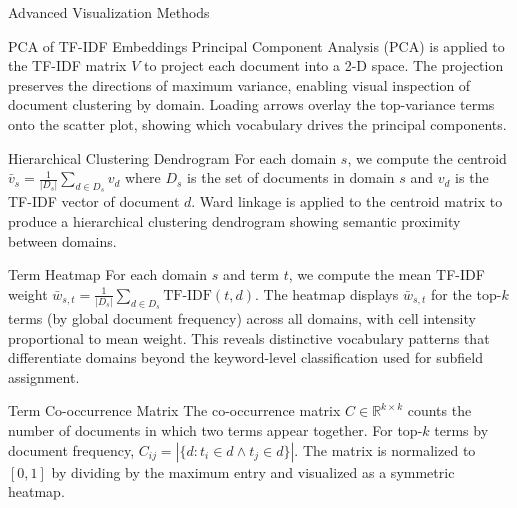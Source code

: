 \documentclass[
  ignorenonframetext,
]{beamer}
\begin{document}
\begin{frame}[allowframebreaks]{Advanced Visualization Methods
\label{sec:appendix_viz}}
\protect{}\label{advanced-visualization-methods}
\begin{block}{PCA of TF-IDF Embeddings}
\protect{}\label{pca-of-tf-idf-embeddings}
Principal Component Analysis (PCA) is applied to the TF-IDF matrix \(V\)
to project each document into a 2-D space. The projection preserves the
directions of maximum variance, enabling visual inspection of document
clustering by domain. Loading arrows overlay the top-variance terms onto
the scatter plot, showing which vocabulary drives the principal
components.
\end{block}

\begin{block}{Hierarchical Clustering Dendrogram}
\protect{}\label{hierarchical-clustering-dendrogram}
For each domain \(s\), we compute the centroid
\(\bar{v}_s = \frac{1}{|D_s|} \sum_{d \in D_s} v_d\) where \(D_s\) is
the set of documents in domain \(s\) and \(v_d\) is the TF-IDF vector of
document \(d\). Ward linkage is applied to the centroid matrix to
produce a hierarchical clustering dendrogram showing semantic proximity
between domains.
\end{block}

\begin{block}{Term Heatmap}
\protect{}\label{term-heatmap}
For each domain \(s\) and term \(t\), we compute the mean TF-IDF weight
\(\bar{w}_{s,t} = \frac{1}{|D_s|} \sum_{d \in D_s} \text{TF-IDF}(t, d)\).
The heatmap displays \(\bar{w}_{s,t}\) for the top-\(k\) terms (by
global document frequency) across all domains, with cell intensity
proportional to mean weight. This reveals distinctive vocabulary
patterns that differentiate domains beyond the keyword-level
classification used for subfield assignment.
\end{block}

\begin{block}{Term Co-occurrence Matrix}
\protect{}\label{term-co-occurrence-matrix}
The co-occurrence matrix \(C \in \mathbb{R}^{k \times k}\) counts the
number of documents in which two terms appear together. For top-\(k\)
terms by document frequency,
\(C_{ij} = |\{d : t_i \in d \land t_j \in d\}|\). The matrix is
normalized to \([0, 1]\) by dividing by the maximum entry and visualized
as a symmetric heatmap.

\FloatBarrier
\end{block}
\end{frame}
\end{document}
